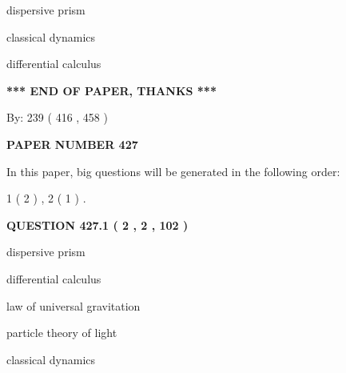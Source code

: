 \documentclass[12pt]{article}
\begin{document}
 
dispersive prism
 
 
classical dynamics
 
 
differential calculus
 
 
 
 
   
   
\vspace{1.0in} 
{\textbf{\large{ *** END OF PAPER, THANKS *** }}} 
   
   
\hspace{1.0in} By: 
 239 ( 416 ,  458 )
   
   
   
   
\newpage 
\setcounter{page}{ 
   427001 } 
   
   
   
   
 {\textbf{ \Large{ PAPER NUMBER  427  }}}
   
   
\vspace{0.2in}
   
   
   
   
   
\vspace{0.2in}
   
In this paper, big questions will be generated in the following order: 
   
   
   1 ( 2 )
 ,
   2 ( 1 )
 .
  
\vspace{0.2in}
  
{\textbf{\Large{QUESTION
427.1 
 ( 2 , 2 , 102 )
}}}
  
  
 
 
\noindent{}
 
 
dispersive prism
 
 
differential calculus
 
 
law of universal gravitation
 
 
particle theory of light
 
 
classical dynamics
 
 
 
 
  
\vspace{0.2in}
  
\end{document}
